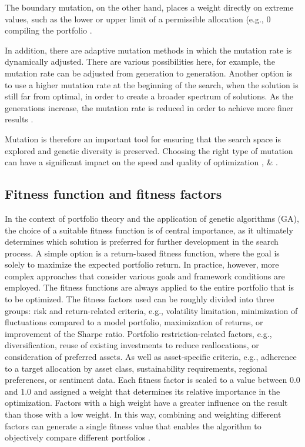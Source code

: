 \documentclass{agasthesis}
\begin{document}
The boundary mutation, on the other hand, places a weight directly on extreme values, such as the lower or upper limit of a 
permissible allocation (e.g., 0%
compiling the portfolio \cite[p. 181]{rajakumar_static_2013}.

In addition, there are adaptive mutation methods in which the mutation rate is dynamically adjusted. There are various possibilities here, 
for example, the mutation rate can be adjusted from generation to generation. Another option is to use a higher mutation rate at the beginning 
of the search, when the solution is still far from optimal, in order to create a broader spectrum of solutions. As the generations increase, 
the mutation rate is reduced in order to achieve more finer results \cite[p. 181]{rajakumar_static_2013}.

Mutation is therefore an important tool for ensuring that the search space is explored and genetic diversity is preserved. 
Choosing the right type of mutation can have a significant impact on the speed and quality of optimization \cite{rajakumar_static_2013}, \cite[p. 8 & 129-130]{melanie_introduction_1999} & \cite[p. 471]{kalayci_review_2017}.


\subsection{Fitness function and fitness factors}
In the context of portfolio theory and the application of genetic algorithms (GA), the choice of a suitable fitness function is of central importance, 
as it ultimately determines which solution is preferred for further development in the search process. A simple option is a return-based fitness function, 
where the goal is solely to maximize the expected portfolio return. In practice, however, more complex approaches that consider various goals and framework 
conditions are employed. The fitness functions are always applied to the entire portfolio that is to be optimized. The fitness factors used can be roughly divided 
into three groups: risk and return-related criteria, e.g., volatility limitation, minimization of fluctuations compared to a model portfolio, maximization of returns, 
or improvement of the Sharpe ratio. Portfolio restriction-related factors, e.g., diversification, reuse of existing investments to reduce reallocations, or consideration 
of preferred assets. As well as asset-specific criteria, e.g., adherence to a target allocation by asset class, sustainability requirements, regional preferences, or sentiment data. 
Each fitness factor is scaled to a value between 0.0 and 1.0 and assigned a weight that determines its relative importance in the optimization. Factors with a high weight have a greater 
influence on the result than those with a low weight. In this way, combining and weighting different factors can generate a single fitness value that enables the algorithm to objectively 
compare different portfolios \cite[p. 206-207]{soldatos_big_2022}.
\end{document}
